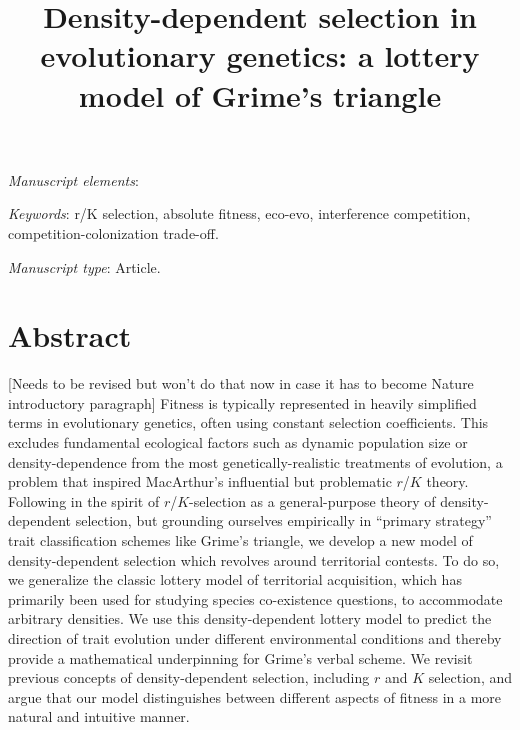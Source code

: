 \documentclass[11pt]{article}
\title{Density-dependent selection in evolutionary genetics: a lottery model of Grime's triangle}
\date{}
\begin{document}
\maketitle




\bigskip

\textit{Manuscript elements}: 

\bigskip

\textit{Keywords}: r/K selection, absolute fitness, eco-evo, interference competition, competition-colonization trade-off.

\bigskip

\textit{Manuscript type}: Article. 

\bigskip


\linenumbers{}
\modulolinenumbers[3]

\newpage{}

\section*{Abstract}

[Needs to be revised but won't do that now in case it has to become Nature introductory paragraph]
Fitness is typically represented in heavily simplified terms in evolutionary genetics, often using constant selection coefficients. This excludes fundamental ecological factors such as dynamic population size or density-dependence from the most genetically-realistic treatments of evolution, a problem that inspired MacArthur's influential but problematic $r$/$K$ theory. Following in the spirit of $r$/$K$-selection as a general-purpose theory of density-dependent selection, but grounding ourselves empirically in ``primary strategy'' trait classification schemes like Grime's triangle, we develop a new model of density-dependent selection which revolves around territorial contests. To do so, we generalize the classic lottery model of territorial acquisition, which has primarily been used for studying species co-existence questions, to accommodate arbitrary densities. We use this density-dependent lottery model to predict the direction of trait evolution under different environmental conditions and thereby provide a mathematical underpinning for Grime's verbal scheme. We revisit previous concepts of density-dependent selection, including $r$ and $K$ selection, and argue that our model distinguishes between different aspects of fitness in a more natural and intuitive manner.
\end{document}
